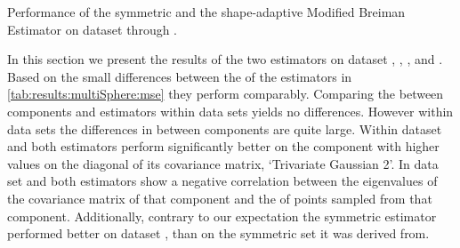 \begin{table}
	\centering
	
	\caption{Performance of the symmetric and the shape-adaptive Modified Breiman Estimator on dataset \ferdosiTwo through \baakmanThree.} 	
	\label{tab:results:multiSphere:mse}
\end{table}

In this section we present the results of the two estimators on dataset \ferdosiTwo, \baakmanTwo, \ferdosiThree, and \baakmanThree.
	Based on the small differences between the \mses of the estimators in \cref{tab:results:multiSphere:mse} they perform comparably. 
	Comparing the \MSE between components and estimators within data sets yields no differences. However within data sets the differences in \mses between components are quite large.
	Within dataset \ferdosiTwo and \baakmanTwo both estimators perform significantly better on the component with higher values on the diagonal of its covariance matrix, \ie `Trivariate Gaussian 2'.
	In data set \ferdosiThree and \baakmanThree both estimators show a negative correlation between the eigenvalues of the covariance matrix of that component and the \MSE of points sampled from that component. Additionally, contrary to our expectation the symmetric estimator performed better on dataset \baakmanThree, than on the symmetric set it was derived from.

